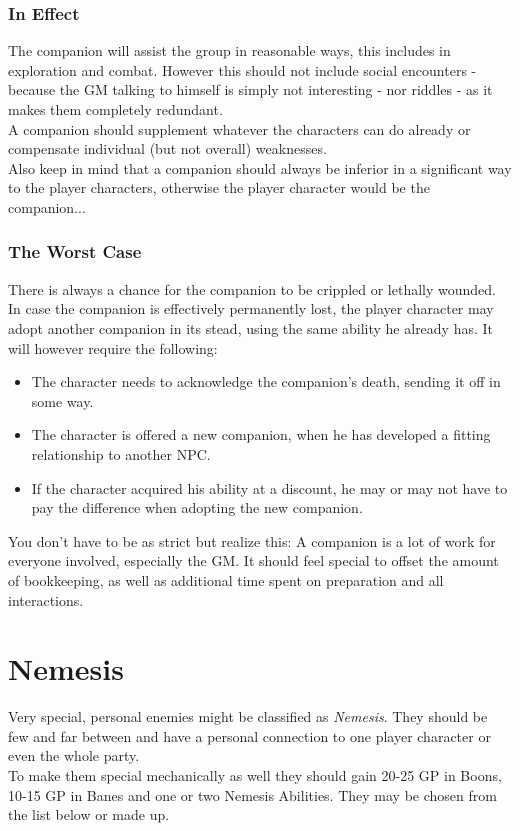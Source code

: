 \documentclass[12pt,a4paper,openany]{book}
\begin{document}
	\subsection{In Effect}
	The companion will assist the group in reasonable ways, this includes in exploration and combat. However this should not include social encounters - because the GM talking to himself is simply not interesting - nor riddles - as it makes them completely redundant.\\
	A companion should supplement whatever the characters can do already or compensate individual (but not overall) weaknesses.\\
	Also keep in mind that a companion should always be inferior in a significant way to the player characters, otherwise the player character would be the companion...
	\subsection{The Worst Case}
	There is always a chance for the companion to be crippled or lethally wounded. In case the companion is effectively permanently lost, the player character may adopt another companion in its stead, using the same ability he already has. It will however require the following:
	\vspace{-8mm}
	\begin{itemize}
		\setlength\itemsep{-8mm}
		\item The character needs to acknowledge the companion's death, sending it off in some way.
		\item The character is offered a new companion, when he has developed a fitting relationship to another NPC.
		\item If the character acquired his ability at a discount, he may or may not have to pay the difference when adopting the new companion.
	\end{itemize}
	You don't have to be as strict but realize this:
	A companion is a lot of work for everyone involved, especially the GM. It should feel special to offset the amount of bookkeeping, as well as additional time spent on preparation and all interactions.
	

	\chapter{Nemesis}
	Very special, personal enemies might be classified as \emph{Nemesis}. They should be few and far between and have a personal connection to one player character or even the whole party.\\
	To make them special mechanically as well they should gain 20-25 GP in Boons, 10-15 GP in Banes and one or two Nemesis Abilities. They may be chosen from the list below or made up.
\end{document}
